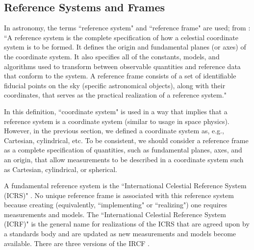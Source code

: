 \documentclass[draft]{agujournal2019}
\begin{document}

\subsection{Reference Systems and Frames}

In astronomy, the terms ``reference system" and ``reference frame" are used; from : ``A reference system is the complete specification of how a celestial coordinate system is to be formed. It defines the origin and fundamental planes (or axes) of the coordinate system. It also specifies all of the constants, models, and algorithms used to transform between observable quantities and reference data that conform to the system. A reference frame consists of a set of identifiable fiducial points on the sky (specific astronomical objects), along with their coordinates, that serves as the practical realization of a reference system."

In this definition, ``coordinate system" is used in a way that implies that a reference system is a coordinate system (similar to usage in space physics). However, in the previous section, we defined a coordinate system as, e.g., Cartesian, cylindrical, etc. To be consistent, we should consider a reference frame as a complete specification of quantities, such as fundamental planes, axes, and an origin, that allow measurements to be described in a coordinate system such as Cartesian, cylindrical, or spherical.


A fundamental reference system is the ``International Celestial Reference System (ICRS)" \cite{Petit2010}. No unique reference frame is associated with this reference system because creating (equivalently, ``implementing" or ``realizing") one requires measurements and models. The ``International Celestial Reference System (ICRF)" is the general name for realizations of the ICRS that are agreed upon by a standards body and are updated as new measurements and models become available. There are three versions of the IRCF \cite{Charlot2020}.
\end{document}
